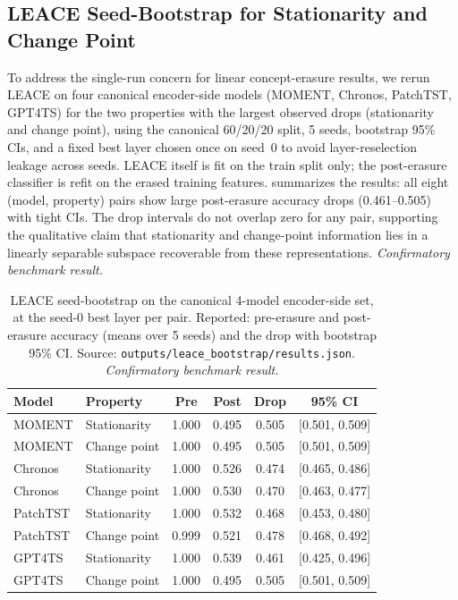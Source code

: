 \documentclass{article}
\begin{document}
\subsection{LEACE Seed-Bootstrap for Stationarity and Change Point}
\label{sec:leace_bootstrap}

To address the single-run concern for linear concept-erasure results, we rerun LEACE on four canonical encoder-side models (MOMENT, Chronos, PatchTST, GPT4TS) for the two properties with the largest observed drops (stationarity and change point), using the canonical 60/20/20 split, 5 seeds, bootstrap 95\% CIs, and a fixed best layer chosen once on seed~0 to avoid layer-reselection leakage across seeds. LEACE itself is fit on the train split only; the post-erasure classifier is refit on the erased training features.  summarizes the results: all eight (model, property) pairs show large post-erasure accuracy drops (0.461--0.505) with tight CIs. The drop intervals do not overlap zero for any pair, supporting the qualitative claim that stationarity and change-point information lies in a linearly separable subspace recoverable from these representations. \emph{Confirmatory benchmark result.}

\begin{table}[htbp]
\caption{LEACE seed-bootstrap on the canonical 4-model encoder-side set, at the seed-0 best layer per pair. Reported: pre-erasure and post-erasure accuracy (means over 5 seeds) and the drop with bootstrap 95\% CI. Source: \texttt{outputs/leace\_bootstrap/results.json}. \emph{Confirmatory benchmark result.}}
\label{tab:leace_bootstrap}
\centering
\small
\begin{tabular}{llcccc}
\toprule
Model & Property & Pre & Post & Drop & 95\% CI \\
\midrule
MOMENT   & Stationarity  & 1.000 & 0.495 & 0.505 & [0.501, 0.509] \\
MOMENT   & Change point  & 1.000 & 0.495 & 0.505 & [0.501, 0.509] \\
Chronos  & Stationarity  & 1.000 & 0.526 & 0.474 & [0.465, 0.486] \\
Chronos  & Change point  & 1.000 & 0.530 & 0.470 & [0.463, 0.477] \\
PatchTST & Stationarity  & 1.000 & 0.532 & 0.468 & [0.453, 0.480] \\
PatchTST & Change point  & 0.999 & 0.521 & 0.478 & [0.468, 0.492] \\
GPT4TS   & Stationarity  & 1.000 & 0.539 & 0.461 & [0.425, 0.496] \\
GPT4TS   & Change point  & 1.000 & 0.495 & 0.505 & [0.501, 0.509] \\
\bottomrule
\end{tabular}
\end{table}
\end{document}
